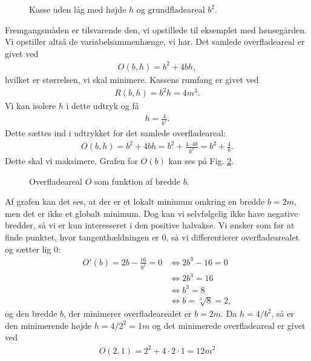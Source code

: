 \begin{exa}
\begin{figure}[H]
\caption{Kasse uden låg med højde $h$ og grundfladeareal $b^2$.}
\label{fig:kasse}
\end{figure}
Fremgangsmåden er tilsvarende den, vi opstillede til eksemplet med hønsegården. Vi opstiller altså de variabelsammenhænge, vi har. Det samlede overfladeareal er givet ved
\begin{align*}
O(b,h) = b^2+4bh,
\end{align*}
hvilket er størrelsen, vi skal minimere. Kassens rumfang er givet ved
\begin{align*}
R(b,h) = b^2h = 4m^3.
\end{align*}
Vi kan isolere $h$ i dette udtryk og få
\begin{align*}
h = \frac{4}{b^2}.
\end{align*}
Dette sættes ind i udtrykket for det samlede overfladeareal:
\begin{align*}
O(b,h) = b^2+ 4bh = b^2 + \frac{4\cdot4b}{b^2} = b^2+\frac{4}{b}.
\end{align*}
Dette skal vi maksimere. Grafen for $O(b)$ kan ses på Fig. \ref{fig:kassegraf}.
\begin{figure}[H]
	\centering
	\caption{Overfladeareal $O$ som funktion af bredde $b$.}
	\label{fig:kassegraf}
\end{figure}

Af grafen kan det ses, at der er et lokalt minimum omkring en bredde $b=2m$, men det er ikke et globalt minimum. Dog kan vi selvfølgelig ikke have negative bredder, så vi er kun interesseret i den positive halvakse. Vi ønsker som før at finde punktet, hvor tangenthældningen er $0$, så vi differentierer overfladearealet og sætter lig $0$:
\begin{align*}
O'(b) = 2b-\frac{16}{b^2}=0&\Leftrightarrow 2b^3-16=0\\
						&\Leftrightarrow 2b^3 = 16\\
						&\Leftrightarrow b^3 = 8\\
						&\Leftrightarrow b = \sqrt[3]{8} = 2,
\end{align*}
og den bredde $b$, der minimerer overfladearealet er $b=2m$. Da $h=4/b^2$, så er den minimerende højde $h=4/2^2=1m$ og det minimerede overfladeareal er givet ved
\begin{align*}
O(2,1) = 2^2+4\cdot 2\cdot 1 = 12m^2
\end{align*}
\end{exa}

